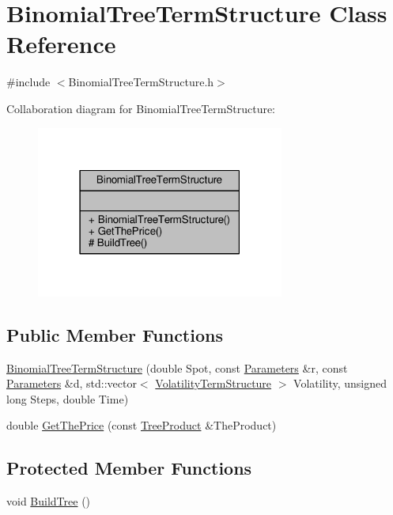 \hypertarget{classBinomialTreeTermStructure}{}\section{Binomial\+Tree\+Term\+Structure Class Reference}
\label{classBinomialTreeTermStructure}


{\ttfamily \#include $<$Binomial\+Tree\+Term\+Structure.\+h$>$}



Collaboration diagram for Binomial\+Tree\+Term\+Structure\+:
\nopagebreak
\begin{figure}[H]
\begin{center}
\leavevmode
\includegraphics[width=231pt]{classBinomialTreeTermStructure__coll__graph}
\end{center}
\end{figure}
\subsection*{Public Member Functions}
\begin{DoxyCompactItemize}
\item 
\hyperlink{classBinomialTreeTermStructure_a3f364298f038d37e9b239443f0373945}{Binomial\+Tree\+Term\+Structure} (double Spot, const \hyperlink{classParameters}{Parameters} \&r, const \hyperlink{classParameters}{Parameters} \&d, std\+::vector$<$ \hyperlink{structVolatilityTermStructure}{Volatility\+Term\+Structure} $>$ Volatility, unsigned long Steps, double Time)
\item 
double \hyperlink{classBinomialTreeTermStructure_ab328bc5ad38c374992dc1d595e3465c4}{Get\+The\+Price} (const \hyperlink{classTreeProduct}{Tree\+Product} \&The\+Product)
\end{DoxyCompactItemize}
\subsection*{Protected Member Functions}
\begin{DoxyCompactItemize}
\item 
void \hyperlink{classBinomialTreeTermStructure_a7cfa6b6f89f80964a0294ad1d1397254}{Build\+Tree} ()
\end{DoxyCompactItemize}



